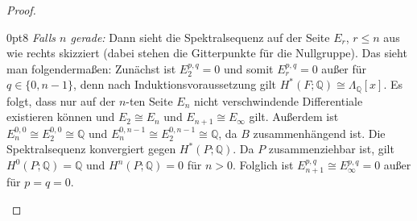 \documentclass[11pt, a4paper, german]{article}
\theoremstyle{definition}
\theoremstyle{remark}
\newcommand{\Q}{\mathbb{Q}} %
\newcommand{\zeroDot}[2]{\node[draw,circle,inner sep=0.4pt,fill] at (#1,#2) {};} %
\begin{document}
\begin{proof}
  \renewcommand\windowpagestuff{
    \begin{center}\begin{tikzpicture}[x=16pt,y=16pt]\begin{scope}[shift={(0,0)}]
      \foreach \x in {1,2,3,5,6,7}{
        \foreach \y in {0,1,...,3}{
          \zeroDot{\x}{\y}
        }
      }
      \foreach \x in {0,...,8}{
        \zeroDot{\x}{4}
      }
      \foreach \y in {0,...,4}{
        \node at (9.5,\y) {$\cdots$};
      }
      \node at (0,0) {$\Q$\small $1$};
      \zeroDot{0}{1}
      \zeroDot{0}{2}
      \node at (0,3) {$\Q$\small $a$};
      \node at (4,0) {$\Q$\small $x$};
      \zeroDot{4}{1}
      \zeroDot{4}{2}
      \node at (4,3) {$\Q$\small $ax$};
      \draw[->,gray] (0.6,2.6) -- (3.4,0.4);
      \node at (8,0) {$\Q$\small $x^2$};
      \zeroDot{8}{1}
      \zeroDot{8}{2}
      \node at (8,3) {$\Q$\small $ax^2$};
      \draw[->,gray] (4.6,2.6) -- (7.4,0.4);
      \draw[->] (-0.7,-0.6) -- (10.3,-0.6); %
      \draw[->] (-0.7,-0.6) -- (-0.7,4.5); %
      \node[left] at (-0.7,0) {$0$};
      \node[left] at (-0.9,1.7) {\vdots};
      \node[left] at (-0.7,3) {$n{-}1$};
      \node[below] at (0,-0.6) {$0$};
      \node[below] at (2,-0.7) {$\cdots$};
      \node[below] at (4,-0.7) {$n$};
      \node[below] at (6,-0.7) {$\cdots$};
      \node[below] at (8,-0.6) {$2n$};
      \node[below] at (9.5,-0.7) {$\cdots$};
    \end{scope}\end{tikzpicture}\end{center}
  }
  \opencutright
  \begin{cutout}{0}{\dimexpr\linewidth-8cm\relax}{0pt}{8}
    \emph{Falls $n$ gerade:} \enspace
    Dann sieht die Spektralsequenz auf der Seite $E_r$, $r \leq n$ aus wie rechts skizziert (dabei stehen die Gitterpunkte für die Nullgruppe).
    Das sieht man folgendermaßen: Zunächst ist $E_2^{p,q} = 0$ und somit $E_r^{p,q} = 0$ außer für $q \in \{ 0, n{-}1 \}$, denn nach Induktionsvoraussetzung gilt $H^*(F; \Q) \cong \Lambda_\Q[x]$.
    Es folgt, dass nur auf der $n$-ten Seite $E_n$ nicht verschwindende Differentiale existieren können und $E_2 \cong E_n$ und $E_{n+1} \cong E_\infty$ gilt.
    Außerdem ist $E_n^{0,0} \cong E_2^{0,0} \cong \Q$ und $E_n^{0,n-1} \cong E_2^{0,n-1} \cong \Q$, da $B$ zusammenhängend ist.
    Die Spektralsequenz konvergiert gegen $H^*(P; \Q)$.
    Da $P$ zusammenziehbar ist, gilt $H^0(P; \Q) = \Q$ und $H^n(P; \Q) = 0$ für $n > 0$.
    Folglich ist $E_{n+1}^{p,q} \cong E_\infty^{p,q} = 0$ außer für $p = q = 0$.

\end{cutout}
\end{proof}
\end{document}
